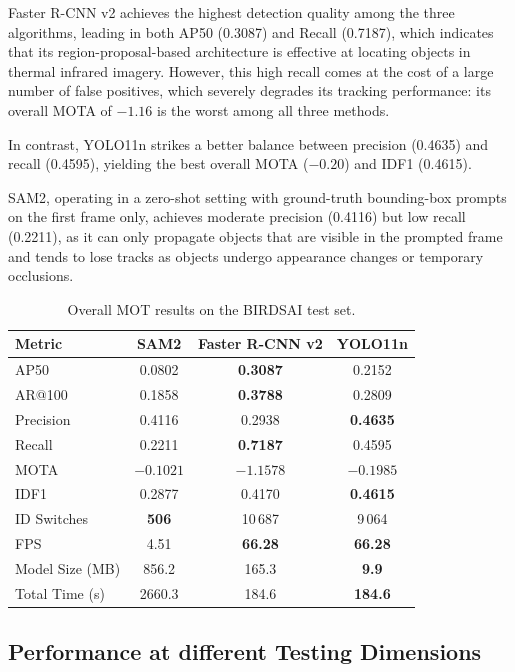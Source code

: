 \documentclass[11pt]{article}
\begin{document}
Faster R-CNN v2 achieves the highest detection quality among the three algorithms, leading in both AP50 (0.3087) and Recall (0.7187), 
which indicates that its region-proposal-based architecture is effective at locating objects in thermal infrared imagery. However, 
this high recall comes at the cost of a large number of false positives, which severely degrades its tracking performance: 
its overall MOTA of $-1.16$ is the worst among all three methods. 

In contrast, YOLO11n strikes a better balance between precision (0.4635) and recall (0.4595), 
yielding the best overall MOTA ($-0.20$) and IDF1 (0.4615). 

SAM2, operating in a zero-shot setting with ground-truth bounding-box prompts on the first frame only, achieves moderate precision (0.4116) 
but low recall (0.2211), as it can only propagate objects that are visible in the prompted frame and tends to lose tracks as objects undergo appearance changes or temporary occlusions.

\begin{table}[htbp]
\centering
\begin{tabular}{lccc}
\toprule
Metric & SAM2 & Faster R-CNN v2 & YOLO11n \\
\midrule
AP50            & 0.0802   & \textbf{0.3087} & 0.2152  \\
AR@100          & 0.1858   & \textbf{0.3788} & 0.2809  \\
Precision       & 0.4116   & 0.2938          & \textbf{0.4635} \\
Recall          & 0.2211   & \textbf{0.7187} & 0.4595  \\
MOTA            & $-0.1021$  & $-1.1578$         & \textbf{$-0.1985$} \\
IDF1            & 0.2877   & 0.4170          & \textbf{0.4615} \\
ID Switches     & \textbf{506} & 10\,687      & 9\,064  \\
FPS             & 4.51     & \textbf{66.28}  & \textbf{66.28}  \\
Model Size (MB) & 856.2    & 165.3           & \textbf{9.9}    \\
Total Time (s)  & 2660.3   & 184.6           & \textbf{184.6}  \\
\bottomrule
\end{tabular}
\caption{Overall MOT results on the BIRDSAI test set.}
\label{tab:birdsai_mot-overall}
\end{table}

\subsection{Performance at different Testing Dimensions}
\end{document}
